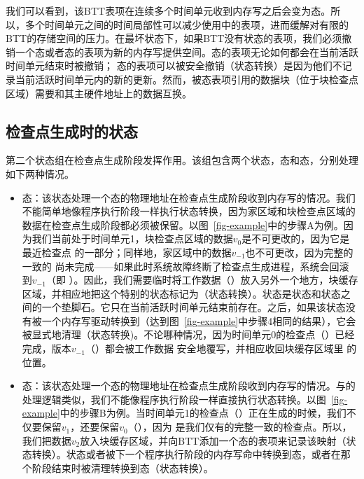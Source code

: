 \begin{itemize}
我们可以看到，该BTT表项在连续多个时间单元收到内存写之后会变为态。所以，多个时间单元之间的时间局部性可以减少使用中的表项，进而缓解对有限的BTT的存储空间的压力。在最坏状态下，如果BTT没有状态的表项，我们必须撤销一个态或者态的表项为新的内存写提供空间。态的表项无论如何都会在当前活跃时间单元结束时被撤销；
态的表项可以被安全撤销（状态转换）是因为他们不记录当前活跃时间单元内的新的更新。然而，被态表项引用的数据块（位于块检查点区域）需要和其主硬件地址上的数据互换。

\subsection{检查点生成时的状态}
\label{subsec:states-ckpt}

第二个状态组在检查点生成阶段发挥作用。该组包含两个状态，态和态，分别处理如下两种情况。

\begin{itemize}
\item
\textbf{}态：该状态处理一个态的物理地址在检查点生成阶段收到内存写的情况。我们不能简单地像程序执行阶段一样执行状态转换，因为家区域和块检查点区域的数据在检查点生成阶段都必须被保留。以图~\ref{fig-example}中的步骤A为例。因为我们当前处于时间单元1，块检查点区域的数据$v_0$是不可更改的，因为它是最近检查点 \cl 的一部分；同样地，家区域中的数据$v_{-1}$也不可更改，因为完整的一致的 \cl 尚未完成——如果此时系统故障终断了检查点生成进程，系统会回滚到$v_{-1}$（即 \cp）。因此，我们需要临时将工作数据（\wa）放入另外一个地方，块缓存区域，并相应地把这个特别的状态标记为（状态转换）。状态是状态和状态之间的一个垫脚石。它只在当前活跃时间单元结束前存在。之后，如果该状态没有被一个内存写驱动转换到（达到图~\ref{fig-example}中步骤4相同的结果），它会被显式地清理（状态转换)。不论哪种情况，因为时间单元0的检查点（\cl）已经完成，版本$v_{-1}$（\cp）都会被工作数据 \wa 安全地覆写，并相应收回块缓存区域里 \wa 的位置。
\item
\textbf{}态：该状态处理一个态的物理地址在检查点生成阶段收到内存写的情况。与的处理逻辑类似，我们不能像程序执行阶段一样直接执行状态转换。以图~\ref{fig-example}中的步骤B为例。当时间单元1的检查点（\cl）正在生成的时候，我们不仅要保留$v_1$，还要保留$v_0$（\cp），因为 \cp 是我们仅有的完整一致的检查点。所以，我们把数据$v_2$放入块缓存区域，并向BTT添加一个态的表项来记录该映射（状态转换）。状态或者被下一个程序执行阶段的内存写命中转换到态，或者在那个阶段结束时被清理转换到态（状态转换）。
\end{itemize}


\end{itemize}
